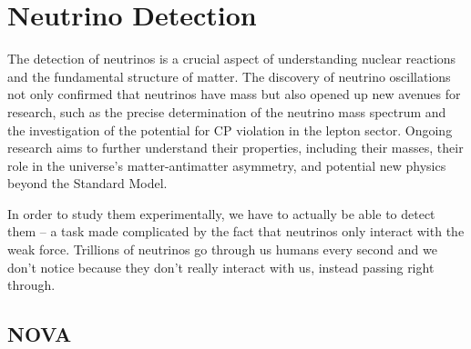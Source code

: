 \section{Neutrino Detection}

The detection of neutrinos is a crucial aspect of understanding nuclear reactions and the fundamental structure of matter.
The discovery of neutrino oscillations not only confirmed that neutrinos have mass but also opened up new avenues for research, such as the precise determination of the neutrino mass spectrum and the investigation of the potential for CP violation in the lepton sector.
Ongoing research aims to further understand their properties, including their masses, their role in the universe's matter-antimatter asymmetry, and potential new physics beyond the Standard Model.

In order to study them experimentally, we have to actually be able to detect them -- a task made complicated by the fact that neutrinos only interact with the weak force.
Trillions of neutrinos go through us humans every second and we don't notice because they don't really interact with us, instead passing right through.






  \subsection{NOVA}